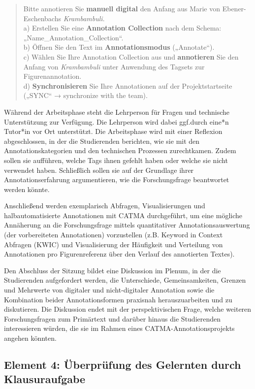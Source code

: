 \documentclass[
          a4paper,
        ]{article}
\begin{document}
\begin{quote}
Bitte annotieren Sie \textbf{manuell digital} den Anfang aus Marie von
Ebener-Eschenbachs \emph{Krambambuli}.\\
a) Erstellen Sie eine \textbf{Annotation Collection} nach dem Schema:
„Name\_Annotation\_Collection``.\\
b) Öffnen Sie den Text im \textbf{Annotationsmodus} („Annotate``).\\
c) Wählen Sie Ihre Annotation Collection aus und \textbf{annotieren} Sie
den Anfang von \emph{Krambambuli} unter Anwendung des Tagsets zur
Figurenannotation.\\
d) \textbf{Synchronisieren} Sie Ihre Annotationen auf der
Projektstartseite („SYNC`` → synchronize with the team).
\end{quote}

Während der Arbeitsphase steht die Lehrperson für Fragen und technische
Unterstützung zur Verfügung. Die Lehrperson wird dabei ggf.durch eine*n
Tutor*in vor Ort unterstützt. Die Arbeitsphase wird mit einer Reflexion
abgeschlossen, in der die Studierenden berichten, wie sie mit den
Annotationskategorien und den technischen Prozessen zurechtkamen. Zudem
sollen sie aufführen, welche Tags ihnen gefehlt haben oder welche sie
nicht verwendet haben. Schließlich sollen sie auf der Grundlage ihrer
Annotationserfahrung argumentieren, wie die Forschungsfrage beantwortet
werden könnte.

Anschließend werden exemplarisch Abfragen, Visualisierungen und
halbautomatisierte Annotationen mit CATMA durchgeführt, um eine mögliche
Annäherung an die Forschungsfrage mittels quantitativer
Annotationsauswertung (der vorbereiteten Annotationen) vorzustellen
(z.B. Keyword in Context Abfragen (KWIC) und Visualisierung der
Häufigkeit und Verteilung von Annotationen pro Figurenreferenz über den
Verlauf des annotierten Textes).

Den Abschluss der Sitzung bildet eine Diskussion im Plenum, in der die
Studierenden aufgefordert werden, die Unterschiede, Gemeinsamkeiten,
Grenzen und Mehrwerte von digitaler und nicht-digitaler Annotation sowie
die Kombination beider Annotationsformen praxisnah herauszuarbeiten und
zu diskutieren. Die Diskussion endet mit der perspektivischen Frage,
welche weiteren Forschungsfragen zum Primärtext und darüber hinaus die
Studierenden interessieren würden, die sie im Rahmen eines
CATMA-Annotationsprojekts angehen könnten.

\subsection{Element 4: Überprüfung des Gelernten durch
Klausuraufgabe}\label{element-4-uxfcberpruxfcfung-des-gelernten-durch-klausuraufgabe}
\end{document}

